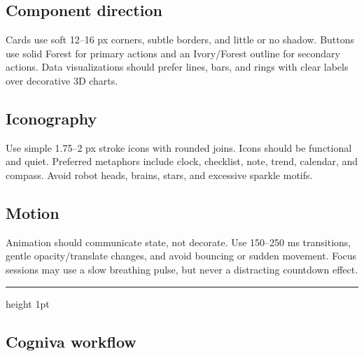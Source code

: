 \documentclass[11pt,a4paper]{article}
\newcommand{\sectiontitle}[1]{\vspace{4pt}{\color{CognivaForest}\LARGE\bfseries #1}\par\vspace{5pt}\hrule height 1pt\vspace{10pt}}
\begin{document}
\subsection*{Component direction}
Cards use soft 12–16 px corners, subtle borders, and little or no shadow. Buttons use solid Forest for primary actions and an Ivory/Forest outline for secondary actions. Data visualizations should prefer lines, bars, and rings with clear labels over decorative 3D charts.

\subsection*{Iconography}
Use simple 1.75–2 px stroke icons with rounded joins. Icons should be functional and quiet. Preferred metaphors include clock, checklist, note, trend, calendar, and compass. Avoid robot heads, brains, stars, and excessive sparkle motifs.

\subsection*{Motion}
Animation should communicate state, not decorate. Use 150–250 ms transitions, gentle opacity/translate changes, and avoid bouncing or sudden movement. Focus sessions may use a slow breathing pulse, but never a distracting countdown effect.

\newpage\sectiontitle{07 — Product experience}
\subsection*{Cogniva workflow}
\begin{center}
\end{center}
\end{document}
